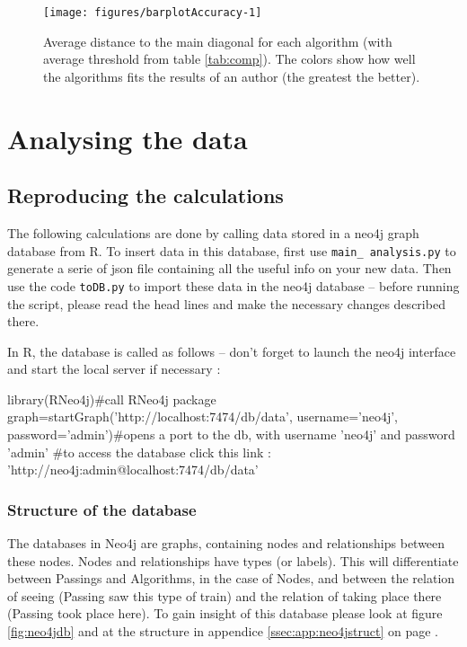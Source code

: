 \documentclass{article}\usepackage[]{graphicx}\usepackage[]{color}
\begin{document}
\begin{Schunk}
\begin{figure}
\texttt{[image: figures/barplotAccuracy-1]} \caption{Average distance to the main diagonal for each algorithm (with average threshold from table \ref{tab:comp}). The colors show how well the algorithms fits the results of an author (the greatest the better).}\label{fig:barplotAccuracy}
\end{figure}
\end{Schunk}
\section{Analysing the data}

\subsection{Reproducing the calculations}
The following calculations are done by calling data stored in a neo4j graph database from R. To insert data in this database, first use {\tt main\_ analysis.py} to generate a serie of json file containing all the useful info on your new data. Then use the code {\tt toDB.py} to import these data in the neo4j database -- before running the script, please read the head lines and make the necessary changes described there.

In R, the database is called as follows -- don't forget to launch the neo4j interface and start the local server if necessary :

\begin{Schunk}
\begin{Sinput}
library(RNeo4j)#call RNeo4j package
graph=startGraph('http://localhost:7474/db/data', username='neo4j', password='admin')#opens a port to the db, with username 'neo4j' and password 'admin'
#to access the database click this link : 'http://neo4j:admin@localhost:7474/db/data'
\end{Sinput}
\end{Schunk}

\subsubsection{Structure of the database}

The databases in Neo4j are graphs, containing nodes and relationships between these nodes. Nodes and relationships have types (or labels). This will differentiate between Passings and Algorithms, in the case of Nodes, and between the relation of seeing (Passing saw this type of train) and the relation of taking place there (Passing took place here). To gain insight of this database please look at figure \ref{fig:neo4jdb} and at the structure in appendice {\ref{ssec:app:neo4jstruct}} on page {\pageref{ssec:app:neo4jstruct}}.
\end{document}
